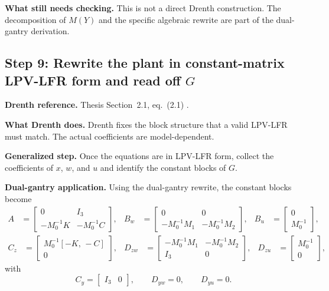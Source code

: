 \documentclass[11pt]{article}
\newcommand{\audititem}[2]{\par\smallskip\noindent\textbf{#1.} #2\par}
\begin{document}
\audititem{What still needs checking}{This is not a direct Drenth construction.
The decomposition of $M(Y)$ and the specific algebraic rewrite are part of the
dual-gantry derivation.}

\subsection{Step 9: Rewrite the plant in constant-matrix LPV-LFR form and read off $G$}

\audititem{Drenth reference}{Thesis Section~2.1, eq.~(2.1)
\cite{drenth2025thesis}.}

\audititem{What Drenth does}{Drenth fixes the block structure that a valid
LPV-LFR must match. The actual coefficients are model-dependent.}

\audititem{Generalized step}{Once the equations are in LPV-LFR form, collect the
coefficients of $x$, $w$, and $u$ and identify the constant blocks of $G$.}

\audititem{Dual-gantry application}{Using the dual-gantry rewrite, the constant
blocks become
\begin{align}
    A &=
    \begin{bmatrix}
        0 & I_3 \\
        -M_0^{-1}K & -M_0^{-1}C
    \end{bmatrix},
    &
    B_w &=
    \begin{bmatrix}
        0 & 0 \\
        -M_0^{-1}M_1 & -M_0^{-1}M_2
    \end{bmatrix},
    &
    B_u &=
    \begin{bmatrix}
        0 \\
        M_0^{-1}
    \end{bmatrix},
    \label{eqv:stateblocks}
\end{align}
\begin{align}
    C_z &=
    \begin{bmatrix}
        M_0^{-1}[-K,\,-C] \\
        0
    \end{bmatrix},
    &
    D_{zw} &=
    \begin{bmatrix}
        -M_0^{-1}M_1 & -M_0^{-1}M_2 \\
        I_3 & 0
    \end{bmatrix},
    &
    D_{zu} &=
    \begin{bmatrix}
        M_0^{-1} \\
        0
    \end{bmatrix},
    \label{eqv:loopblocks}
\end{align}
with
\begin{equation}
    C_y = \begin{bmatrix} I_3 & 0 \end{bmatrix},
    \qquad
    D_{yw} = 0,
    \qquad
    D_{yu} = 0.
    \label{eqv:outblocks}
\end{equation}}
\end{document}
